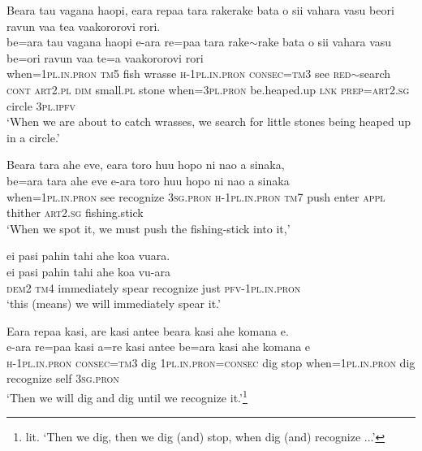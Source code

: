 \ea\label{ex:text28-6}
Beara tau vagana haopi, eara repaa tara rakerake bata o sii vahara vasu beori ravun vaa tea vaakororovi rori.\\
\gll be=ara	tau	vagana	haopi	e-ara	re=paa	tara	rake{$\sim$}rake	bata	o	sii	vahara	vasu	be=ori	ravun	vaa	te=a	vaakororovi	rori\\
     when=1\textsc{pl}.\textsc{in}.\textsc{pron}	\textsc{tm}5	fish	wrasse	\textsc{h}-1\textsc{pl}.\textsc{in}.\textsc{pron}	\textsc{consec}=\textsc{tm}3	see	\textsc{red}{$\sim$}search	\textsc{cont}	\textsc{art}2.\textsc{pl}	\textsc{dim}	small.\textsc{pl}	stone	when=3\textsc{pl}.\textsc{pron}	be.heaped.up	\textsc{lnk}	\textsc{prep}=\textsc{art}2.\textsc{sg}	circle	3\textsc{pl}.\textsc{ipfv}\\
\glt `When we are about to catch wrasses, we search for little stones being heaped up in a circle.'
\z

\ea\label{ex:text28-7}
Beara tara ahe eve, eara toro huu hopo ni nao a sinaka,\\
\gll be=ara	tara	ahe	eve	e-ara	toro	huu	hopo	ni	nao	a	sinaka\\
     when=1\textsc{pl}.\textsc{in}.\textsc{pron}	see	recognize	3\textsc{sg}.\textsc{pron}	\textsc{h}-1\textsc{pl}.\textsc{in}.\textsc{pron}	\textsc{tm}7	push	enter	\textsc{appl}	thither	\textsc{art}2.\textsc{sg}	fishing.stick\\
\glt `When we spot it, we must push the fishing-stick into it,'
\z

\ea\label{ex:text28-8}
ei pasi pahin tahi ahe koa vuara.\\
\gll ei	pasi	pahin	tahi	ahe	koa	vu-ara\\
     \textsc{dem}2	\textsc{tm}4	immediately	spear	recognize	just	\textsc{pfv}-1\textsc{pl}.\textsc{in}.\textsc{pron}\\
\glt `this (means) we will immediately spear it.'
\z

\ea\label{ex:text28-9}
Eara repaa kasi, are kasi antee beara kasi ahe komana e.\\
\gll e-ara	re=paa	kasi	a=re	kasi	antee	be=ara	kasi	ahe	komana	e\\
     \textsc{h}-1\textsc{pl}.\textsc{in}.\textsc{pron}	\textsc{consec}=\textsc{tm}3	dig	1\textsc{pl}.\textsc{in}.\textsc{pron}=\textsc{consec}	dig	stop	when=1\textsc{pl}.\textsc{in}.\textsc{pron}	dig	recognize	self	3\textsc{sg}.\textsc{pron}\\
\glt `Then we will dig and dig until we recognize it.'\footnote{lit. `Then we dig, then we dig (and) stop, when dig (and) recognize ...'}
\z

